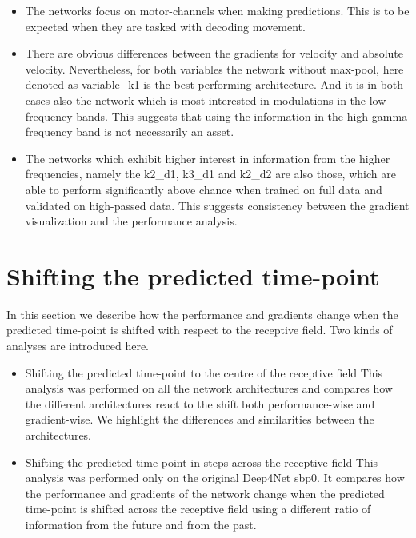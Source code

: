 \begin{itemize}
    \item The networks focus on motor-channels when making predictions.
This is to be expected when they are tasked with decoding movement.
    \item There are obvious differences between the gradients for velocity and absolute velocity.
    Nevertheless, for both variables the network without max-pool, here denoted as {variable}\_k1 is the best performing architecture.
    And it is in both cases also the network which is most interested in modulations in the low frequency bands.
    This suggests that using the information in the high-gamma frequency band is not necessarily an asset.
    \item The networks which exhibit higher interest in information from the higher frequencies, namely the k2\_d1, k3\_d1 and k2\_d2 are also those, which are able to perform significantly above chance when trained on full data and validated on high-passed data.
    This suggests consistency between the gradient visualization and the performance analysis.

\end{itemize}


\section{Shifting the predicted time-point}\label{sec:shifting-the-predicted-time-point}
In this section we describe how the performance and gradients change when the predicted time-point is shifted with respect to the receptive field.
Two kinds of analyses are introduced here.
\begin{itemize}
    \item Shifting the predicted time-point to the centre of the receptive field
This analysis was performed on all the network architectures and compares how the different architectures react to the shift both performance-wise and gradient-wise.
We highlight the differences and similarities between the architectures.
    \item Shifting the predicted time-point in steps across the receptive field
This analysis was performed only on the original Deep4Net sbp0.
It compares how the performance and gradients of the network change when the predicted time-point is shifted across the receptive field using a different ratio of information from the future and from the past.
\end{itemize}


